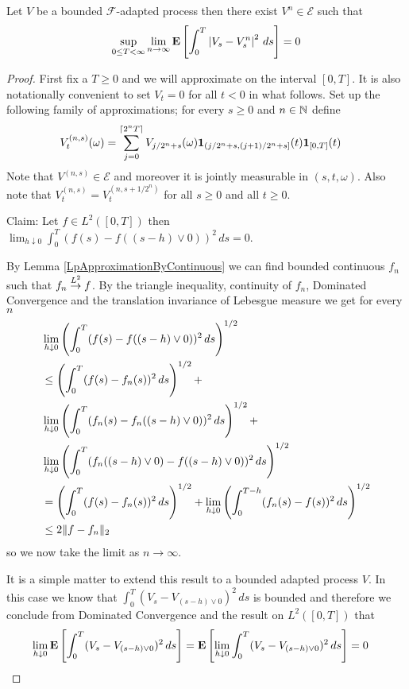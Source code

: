 \begin{lem}\label{SimpleProcessApproximationBoundedLebesgue}Let $V$ be a bounded $\mathcal{F}$-adapted process then there exist $V^n \in \mathcal{E}$ such that 
\begin{align*}
\sup_{0 \leq T < \infty} \lim_{n \to \infty} \textbf{E}\left[\int_0^T \left \vert V_s - V_s^n \right \vert^2 \, ds\right] = 0
\end{align*}
\end{lem}
\begin{proof}
First fix a $T \geq 0$ and we will approximate on the interval $[0,T]$.  It is also notationally convenient to set $V_t = 0$ for all $t < 0$ in what follows.  Set up the following family of approximations; for every $s \geq 0$ and $n \in \mathbb{N}$ define
\begin{align*}
V^{(n,s)}_t(\omega)  &= \sum_{j=0}^{\lceil 2^n T \rceil} V_{j/2^n + s}(\omega) \textbf{1}_{(j/2^n + s, (j+1)/2^n + s]}(t) \textbf{1}_{[0,T]}(t)
\end{align*}
Note that $V^{(n,s)} \in \mathcal{E}$ and moreover it is jointly measurable in $(s,t,\omega)$.  Also note that $V^{(n,s)}_t = V^{(n, s+1/2^n)}_t$ for all $s \geq 0$ and all $t \geq 0$.

Claim: Let $f \in L^2([0,T])$ then $\lim_{h \downarrow 0} \int_0^T (f(s) - f((s - h) \vee 0))^2 \, ds= 0$.

By Lemma \ref{LpApproximationByContinuous} we can find bounded continuous $f_n$ such that $f_n \overset{L^2}\to f$.  By the triangle inequality, continuity of $f_n$, Dominated Convergence and the translation invariance of Lebesgue measure we get for every $n$
\begin{align*}
&\lim_{h \downarrow 0} \left(\int_0^T (f(s) - f((s - h) \vee 0))^2 \, ds\right)^{1/2} \\
&\leq \left(\int_0^T (f(s) -f_n(s))^2 \, ds\right)^{1/2} + \\
&\lim_{h \downarrow 0} \left(\int_0^T (f_n(s) - f_n((s - h) \vee 0))^2 \, ds\right)^{1/2} + \\
&\lim_{h \downarrow 0} \left(\int_0^T (f_n((s-h) \vee 0) - f((s - h) \vee 0))^2 \, ds\right)^{1/2} \\
&=\left(\int_0^T (f(s) -f_n(s))^2 \, ds\right)^{1/2} + \lim_{h \downarrow 0} \left(\int_0^{T-h} (f_n(s) - f(s))^2 \, ds\right)^{1/2}\\
&\leq 2 \lVert f - f_n \rVert_2
\end{align*}
so we now take the limit as $n \to \infty$.

It is a simple matter to extend this result to a bounded adapted process $V$.  In this case we know that $\int_0^T (V_s - V_{(s-h) \vee 0})^2 \, ds$ is bounded and therefore we conclude from Dominated Convergence and the result on $L^2([0,T])$ that
\begin{align*}
\lim_{h \downarrow 0} \textbf{E}\left[\int_0^T (V_s - V_{(s-h) \vee 0})^2 \, ds\right] &= \textbf{E}\left[\lim_{h \downarrow 0} \int_0^T (V_s - V_{(s-h) \vee 0})^2 \, ds\right] = 0
\end{align*}


\end{proof}
